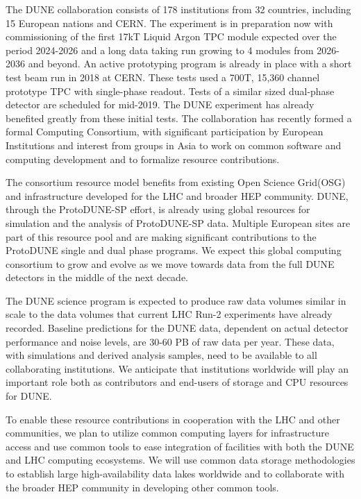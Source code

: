 The DUNE  collaboration consists of 178 institutions from 32 countries, including 15 European nations and CERN. The experiment is in preparation now with commissioning of the first 17kT Liquid Argon TPC  module expected over the period 2024-2026 and a long data taking run growing to 4 modules from 2026-2036 and beyond.  An active prototyping program is already in place with a short test beam run in 2018 at CERN.  These tests used  a 700T, 15,360 channel prototype TPC with single-phase readout.  Tests of a similar sized dual-phase detector are scheduled for mid-2019.   The DUNE experiment has already  benefited greatly from these initial tests.  The collaboration has recently formed a formal Computing Consortium, with significant participation by European Institutions and interest from groups in Asia to work on common software and computing development and to formalize resource contributions.

The consortium resource model benefits from existing Open Science Grid\dshort(OSG)  and  infrastructure developed for the LHC and broader HEP community.  DUNE, through  the ProtoDUNE-SP effort, is already using global resources for simulation and the analysis of ProtoDUNE-SP data.  Multiple European sites are part of this resource pool and are making significant contributions to the ProtoDUNE single and dual phase programs.  We expect this global computing consortium to grow and evolve as we move towards data from the full DUNE detectors in the middle of the next decade.

The DUNE science program is expected to produce raw data volumes similar in scale to the data volumes that current LHC Run-2 experiments have already recorded.  Baseline predictions for the DUNE data, dependent on actual detector performance and noise levels, are 30-60 PB of raw data per year.  These data, with simulations and derived analysis samples, need to be available to all collaborating institutions.  We anticipate that institutions worldwide will play an important role both as contributors and end-users of storage and CPU resources for DUNE.

To enable these resource contributions in cooperation with the LHC and other communities, we plan to utilize common computing layers for infrastructure access and use common tools to ease integration of facilities with both the DUNE and LHC computing ecosystems.  We will use common data storage methodologies to establish large high-availability data lakes worldwide  and to collaborate with the broader HEP community in developing other common tools.


